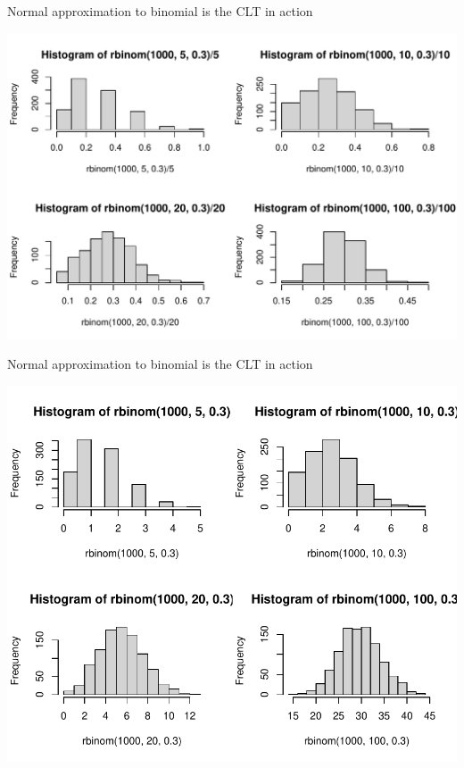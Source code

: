 \documentclass[10pt,handout]{beamer}\usepackage[]{graphicx}\usepackage[]{color}
\makeatletter
\def\maxwidth{ %
  \ifdim\Gin@nat@width>\linewidth
    \linewidth
  \else
    \Gin@nat@width
  \fi
}
\newenvironment{knitrout}{}{} %
\makeatother
\begin{document}
\begin{frame}[fragile]{Normal approximation to binomial is the CLT in action}
\begin{knitrout}\tiny
{}\color{fgcolor}

{\centering \includegraphics[width=\maxwidth]{figure/unnamed-chunk-6-1} 

}


\end{knitrout}
\end{frame}


\begin{frame}[fragile]{Normal approximation to binomial is the CLT in action}
\begin{knitrout}\tiny
{}\color{fgcolor}

{\centering \includegraphics[width=\maxwidth]{figure/unnamed-chunk-7-1} 

}


\end{knitrout}
\end{frame}
\end{document}
